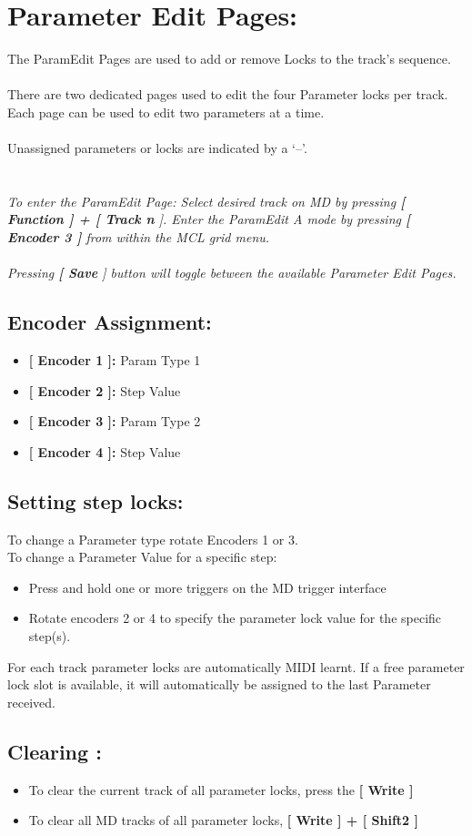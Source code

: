 \chapter{Parameter Edit Pages:}
The ParamEdit Pages are used to add or remove Locks to the track’s sequence.\\
\\
There are two dedicated pages used to edit the four Parameter locks per track.\\
Each page can be used to edit two parameters at a time.\\
\\
Unassigned parameters or locks are indicated by a ‘--’.\\
\\
\\
\textit{To enter the ParamEdit Page: Select desired track on MD by pressing \textbf{[ Function ] + [ Track n }]. Enter the ParamEdit A mode by pressing \textbf{[ Encoder 3 ]} from within the MCL grid menu.}
\\\\
\textit{Pressing \textbf{[ Save }] button will toggle between the available Parameter Edit Pages.}
\section{Encoder Assignment:}
\begin{itemize}
	\item \textbf{[ Encoder 1 ]: } Param Type 1
	\item \textbf{[ Encoder 2 ]: } Step Value
	\item \textbf{[ Encoder 3 ]: } Param Type 2
	\item \textbf{[ Encoder 4 ]: } Step Value
\end{itemize}
\section{Setting step locks:}
To change a Parameter type rotate Encoders 1 or 3.\\
To change a Parameter Value for a specific step:
\begin{itemize}
\item Press and hold one or more triggers on the MD trigger interface
\item Rotate encoders 2 or 4 to specify the parameter lock value for the specific step(s).
\end{itemize}
For each track parameter locks are automatically MIDI learnt. If a free parameter lock slot is available, it will automatically be assigned to the last Parameter received. 
\section{Clearing :}
\begin{itemize}
\item To clear the current track of all parameter locks, press the \textbf{[ Write  ]}
\item To clear all MD tracks of all parameter locks, \textbf{[ Write ] + [ Shift2 ]}
\end{itemize}